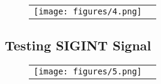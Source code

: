 \documentclass[twoside,11pt]{article}
\begin{document}
\begin{figure}[h]
\begin{center}
\begin{tabular}{ll}
\texttt{[image: figures/4.png]}
\end{tabular}
\end{center}
\end{figure}

\newpage

\subsection{Testing SIGINT Signal}

\begin{figure}[h]
\begin{center}
\begin{tabular}{ll}
\texttt{[image: figures/5.png]}
\end{tabular}
\end{center}
\end{figure}
\end{document}
